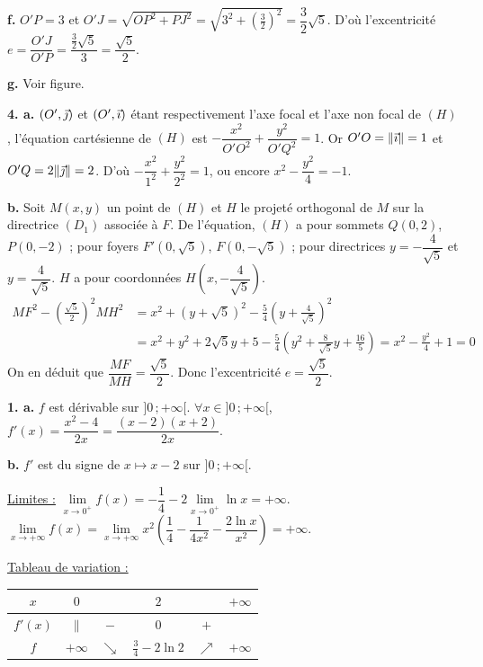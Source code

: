 \documentclass[11pt]{article}
\begin{document}
\textbf{f.} $O'P = 3$ et $O'J = \sqrt{OP^2 + PJ^2} = \sqrt{3^2 + \left(\tfrac{3}{2}\right)^2} = \dfrac{3}{2}\sqrt{5}$. D'où l'excentricité $e = \dfrac{O'J}{O'P} = \dfrac{\frac{3}{2}\sqrt{5}}{3} = \dfrac{\sqrt{5}}{2}$.

\textbf{g.} Voir figure.

\textbf{4. a.} $(O',\vec{\jmath})$ et $(O',\vec{\imath})$ étant respectivement l'axe focal et l'axe non focal de $(H)$, l'équation cartésienne de $(H)$ est $-\dfrac{x^2}{O'O^2} + \dfrac{y^2}{O'Q^2} = 1$. Or $O'O = \|\vec{\imath}\| = 1$ et $O'Q = 2\|\vec{\jmath}\| = 2$. D'où $-\dfrac{x^2}{1^2} + \dfrac{y^2}{2^2} = 1$, ou encore $x^2 - \dfrac{y^2}{4} = -1$.

\textbf{b.} Soit $M(x, y)$ un point de $(H)$ et $H$ le projeté orthogonal de $M$ sur la directrice $(D_1)$ associée à $F$. De l'équation, $(H)$ a pour sommets $Q(0, 2)$, $P(0, -2)$ ; pour foyers $F'(0, \sqrt{5})$, $F(0, -\sqrt{5})$ ; pour directrices $y = -\dfrac{4}{\sqrt{5}}$ et $y = \dfrac{4}{\sqrt{5}}$. $H$ a pour coordonnées $H\!\left(x, -\dfrac{4}{\sqrt{5}}\right)$.
\begin{align*}
MF^2 - \left(\tfrac{\sqrt{5}}{2}\right)^2 MH^2 &= x^2 + (y + \sqrt{5})^2 - \frac{5}{4}\left(y + \frac{4}{\sqrt{5}}\right)^2 \\
&= x^2 + y^2 + 2\sqrt{5}y + 5 - \frac{5}{4}\left(y^2 + \frac{8}{\sqrt{5}}y + \frac{16}{5}\right) = x^2 - \frac{y^2}{4} + 1 = 0
\end{align*}
On en déduit que $\dfrac{MF}{MH} = \dfrac{\sqrt{5}}{2}$. Donc l'excentricité $e = \dfrac{\sqrt{5}}{2}$.


\textbf{1. a.} $f$ est dérivable sur $]0\,;+\infty[$. $\forall x \in ]0\,;+\infty[$, $f'(x) = \dfrac{x^2 - 4}{2x} = \dfrac{(x - 2)(x + 2)}{2x}$.

\textbf{b.} $f'$ est du signe de $x \mapsto x - 2$ sur $]0\,;+\infty[$.

\underline{Limites :} $\lim\limits_{x\to 0^+} f(x) = -\dfrac{1}{4} - 2\lim\limits_{x\to 0^+}\ln x = +\infty$. $\lim\limits_{x\to+\infty} f(x) = \lim\limits_{x\to+\infty} x^2\left(\dfrac{1}{4} - \dfrac{1}{4x^2} - \dfrac{2\ln x}{x^2}\right) = +\infty$.

\underline{Tableau de variation :}
\begin{center}\renewcommand{\arraystretch}{1.4}
\begin{tabular}{|c|ccccc|}
\hline
$x$ & $0$ & & $2$ & & $+\infty$ \\
\hline
$f'(x)$ & $\|$ & $-$ & $0$ & $+$ & \\
\hline
$f$ & $+\infty$ & $\searrow$ & $\frac{3}{4} - 2\ln 2$ & $\nearrow$ & $+\infty$ \\
\hline
\end{tabular}
\end{center}
\end{document}
